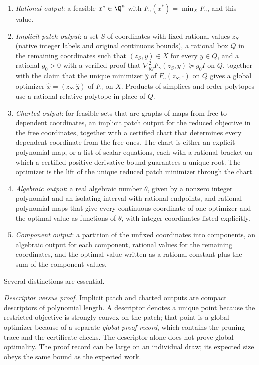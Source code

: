 \begin{definition}\label{def:model:outputs}
\leavevmode
\begin{enumerate}[label=(\alph*)]
\item\label{it:model:rational} \emph{Rational output}: a feasible
$x^*\in\Q^n$ with $F_\gamma(x^*)=\min_XF_\gamma$, and this value.
\item\label{it:model:implicit} \emph{Implicit patch output}: a set $S$ of
coordinates with fixed rational values $z_S$ (native integer labels and
original continuous bounds), a rational box $Q$ in the remaining
coordinates such that $(z_S,y)\in X$ for every $y\in Q$, and a rational
$g_0>0$ with a verified proof that
$\nabla^2_{yy}F_\gamma(z_S,y)\succeq g_0I$ on $Q$, together with the claim
that the unique minimizer $\hat y$ of $F_\gamma(z_S,\cdot)$ on $Q$ gives a
global optimizer $\hat x=(z_S,\hat y)$ of $F_\gamma$ on $X$. Products of
simplices and order polytopes use a rational relative polytope in place of
$Q$.
\item\label{it:model:charted} \emph{Charted output}: for feasible sets that
are graphs of maps from free to dependent coordinates, an implicit patch
output for the reduced objective in the free coordinates, together with a
certified chart that determines every dependent coordinate from the free
ones. The chart is either an explicit polynomial map, or a list of scalar
equations, each with a rational bracket on which a certified positive
derivative bound guarantees a unique root. The optimizer is the lift of the
unique reduced patch minimizer through the chart.
\item\label{it:model:algebraic} \emph{Algebraic output}: a real algebraic
number $\theta$, given by a nonzero integer polynomial and an isolating
interval with rational endpoints, and rational polynomial maps that give
every continuous coordinate of one optimizer and the optimal value as
functions of $\theta$, with integer coordinates listed explicitly.
\item\label{it:model:component} \emph{Component output}: a partition of the
unfixed coordinates into components, an algebraic output for each
component, rational values for the remaining coordinates, and the optimal
value written as a rational constant plus the sum of the component values.
\end{enumerate}
\end{definition}

Several distinctions are essential.

\emph{Descriptor versus proof.} Implicit patch and charted outputs are
compact descriptors of polynomial length. A descriptor denotes a unique
point because the restricted objective is strongly convex on the patch;
that point is a global optimizer because of a separate \emph{global proof
record}, which contains the pruning trace and the certificate checks. The
descriptor alone does not prove global optimality. The proof record can be
large on an individual draw; its expected size obeys the same bound as the
expected work.


